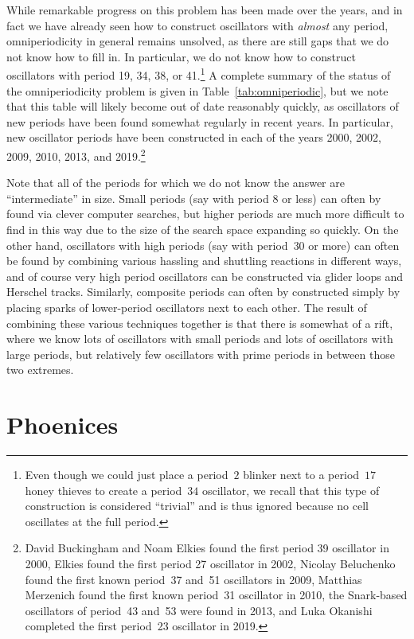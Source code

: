 While remarkable progress on this problem has been made over the years, and in fact we have already seen how to construct oscillators with \emph{almost} any period, omniperiodicity in general remains unsolved, as there are still gaps that we do not know how to fill in. In particular, we do not know how to construct oscillators with period 19, 34, 38, or 41.\footnote{Even though we could just place a period~$2$ blinker next to a period~$17$ honey thieves to create a period~$34$ oscillator, we recall that this type of construction is considered ``trivial'' and is thus ignored because no cell oscillates at the full period.} A complete summary of the status of the omniperiodicity problem is given in Table~\ref{tab:omniperiodic}, but we note that this table will likely become out of date reasonably quickly, as oscillators of new periods have been found somewhat regularly in recent years. In particular, new oscillator periods have been constructed in each of the years 2000, 2002, 2009, 2010, 2013, and 2019.\footnote{David Buckingham and Noam Elkies found the first period 39 oscillator in 2000, Elkies found the first period 27 oscillator in 2002, Nicolay Beluchenko found the first known period~37 and~51 oscillators in 2009, Matthias Merzenich found the first known period~31 oscillator in 2010, the Snark-based oscillators of period~43 and~53 were found in 2013, and Luka Okanishi completed the first period~23 oscillator in 2019.}

Note that all of the periods for which we do not know the answer are ``intermediate'' in size. Small periods (say with period $8$ or less) can often by found via clever computer searches, but higher periods are much more difficult to find in this way due to the size of the search space expanding so quickly. On the other hand, oscillators with high periods (say with period~$30$ or more) can often be found by combining various hassling and shuttling reactions in different ways, and of course very high period oscillators can be constructed via glider loops and Herschel tracks. Similarly, composite periods can often by constructed simply by placing sparks of lower-period oscillators next to each other. The result of combining these various techniques together is that there is somewhat of a rift, where we know lots of oscillators with small periods and lots of oscillators with large periods, but relatively few oscillators with prime periods in between those two extremes.


\section{Phoenices}


